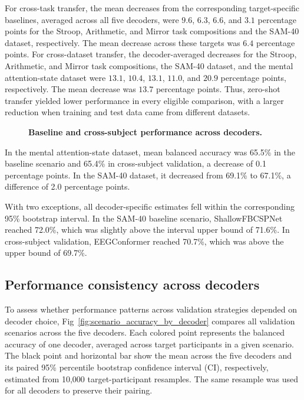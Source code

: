 \documentclass[10pt,letterpaper]{article}
\begin{document}
For cross-task transfer, the mean decreases from the corresponding
target-specific baselines, averaged across all five decoders, were $9.6$,
$6.3$, $6.6$, and $3.1$ percentage points for the Stroop, Arithmetic, and
Mirror task compositions and the SAM-40 dataset, respectively. The mean
decrease across these targets was $6.4$ percentage points. For cross-dataset
transfer, the decoder-averaged decreases for the Stroop, Arithmetic, and Mirror
task compositions, the SAM-40 dataset, and the mental attention-state dataset
were $13.1$, $10.4$, $13.1$, $11.0$, and $20.9$ percentage points,
respectively. The mean decrease was $13.7$ percentage points. Thus, zero-shot
transfer yielded lower performance in every eligible comparison, with a larger
reduction when training and test data came from
different datasets.

\begin{figure}[H]
\centering
\caption{\textbf{Baseline and cross-subject performance across decoders.}}
\label{fig:baseline_vs_cross_subject}
\end{figure}

In the mental attention-state dataset, mean balanced accuracy was 65.5\% in the
baseline scenario and 65.4\% in cross-subject validation, a decrease of 0.1
percentage points. In the SAM-40 dataset, it decreased from 69.1\% to 67.1\%,
a difference of 2.0 percentage points.

With two exceptions, all decoder-specific estimates fell within the
corresponding 95\% bootstrap interval. In the SAM-40 baseline scenario,
ShallowFBCSPNet reached 72.0\%, which was slightly above the interval upper
bound of 71.6\%. In cross-subject validation, EEGConformer reached 70.7\%,
which was above the upper bound of 69.7\%.

\subsection*{Performance consistency across decoders}

To assess whether performance patterns across validation strategies depended on
decoder choice, Fig~\ref{fig:scenario_accuracy_by_decoder} compares all
validation scenarios across the five decoders. Each colored point represents
the balanced accuracy of one decoder, averaged across target participants in a
given scenario. The black point and horizontal bar show the mean
across the five decoders and its paired 95\% percentile bootstrap confidence
interval (CI), respectively, estimated from 10,000 target-participant
resamples. The same resample was used for all decoders to preserve their
pairing.
\end{document}
